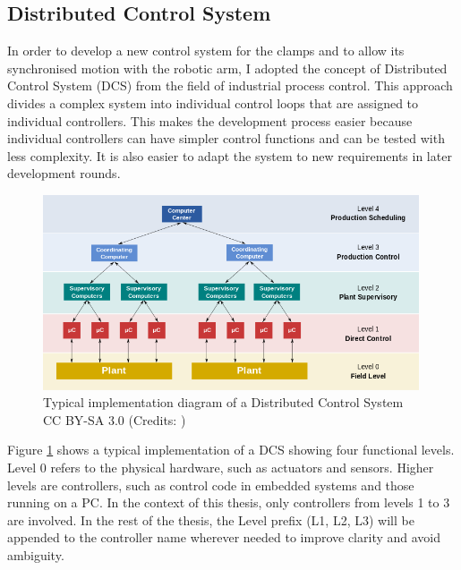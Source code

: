 \subsection{Distributed Control System}
\label{subsection:exploration-2-distributed-control-system}

In order to develop a new control system for the clamps and to allow its synchronised motion with the robotic arm, I adopted the concept of Distributed Control System (DCS) from the field of industrial process control. This approach divides a complex system into individual control loops that are assigned to individual controllers. This makes the development process easier because individual controllers can have simpler control functions and can be tested with less complexity. It is also easier to adapt the system to new requirements in later development rounds. 

\begin{figure}[h]
    \centering
    \includegraphics[width=0.99\textwidth]{images/05/image57.png}
    \caption[Typical implementation diagram of a Distributed Control System]
    {Typical implementation diagram of a Distributed Control System
    \footnotesize{CC BY-SA 3.0 (Credits: \parencite{pugliesiFunctionalLevelsDistributed2014})}}
    \label{fig:distribute-control-system-diagram}
\end{figure}

Figure \ref{fig:distribute-control-system-diagram} shows a typical implementation of a DCS showing four functional levels. {Level 0} refers to the physical hardware, such as actuators and sensors. Higher levels are controllers, such as control code in embedded systems and those running on a PC. In the context of this thesis, only controllers from levels 1 to 3 are involved. In the rest of the thesis, the Level prefix (L1, L2, L3) will be appended to the controller name wherever needed to improve clarity and avoid ambiguity.


